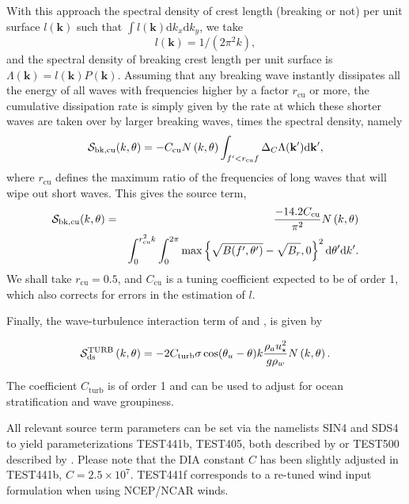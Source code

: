 With this approach the spectral density of crest length (breaking or not) per
unit surface $l(\mathbf{k})$ such that $\int l(\mathbf{k}) \mathrm{d}k_x
\mathrm{d}k_y$, we take
\begin{equation}
l(\mathbf{k})= 1/(2\pi^2 k),
\end{equation}
and the spectral density of breaking crest length per unit surface is
$\Lambda(\mathbf{k})=l(\mathbf{k})P(\mathbf{k})$.  Assuming that any breaking
wave instantly dissipates all the energy of all waves with frequencies higher
by a factor $r_{\mathrm{cu}}$ or more, the cumulative dissipation rate is
simply given by the rate at which these shorter waves are taken over by larger
breaking waves, times the spectral density, namely
\begin{equation}
{\cal S}_{\mathrm{bk,cu}}(k,\theta) = -C_{\mathrm{cu}}  N \left(k,\theta\right) \int_{f' < r_{\mathrm{cu}} f } \Delta_C \Lambda(\mathbf{k'}) \mathrm{d\mathbf{k'}},
\label{Sds_cu1}
\end{equation}
where $r_{\mathrm{cu}}$ defines the maximum ratio of the frequencies of long
waves that will wipe out short waves.  This gives the source term,
\begin{eqnarray}
{\cal S}_{\mathrm{bk,cu}}(k,\theta) &=&  \frac{-14.2 C_{\mathrm{cu}}}{\pi^2}  N \left(k,\theta\right)
 \nonumber \\
& &\int_0^{ r^2_{\mathrm{cu}} k }\int_0^{2\pi}
\max \left\{\sqrt{B(f',\theta')}-\sqrt{B_r},0\right\}^2
\mathrm{d}\theta' \mathrm{d}k'.
\label{Sds_sat_isotropic}
\end{eqnarray}
We shall take $r_{\mathrm{cu}}=0.5$, and $C_{\mathrm{cu}}$ is a tuning
coefficient expected to be of order 1, which also corrects for errors in the
estimation of $l$.


Finally, the wave-turbulence interaction term of \cite{art:TB02} and \cite{art:AJ06},
is given by

\begin{equation}
{\cal S}_{\mathrm{ds}}^{\mathrm{TURB}}\left(k,\theta\right) = - 2
C_{\mathrm{turb}} \sigma \cos(\theta_u - \theta) k \frac{\rho_a
u_\star^2}{g \rho_w}  N\left(k,\theta\right) .
\end{equation}

\noindent
The coefficient $C_{\mathrm{turb}}$ is of order 1 and can be used to adjust for
ocean stratification and wave groupiness.

All relevant source term parameters can be set via the namelists SIN4 and SDS4
to yield parameterizations TEST441b, TEST405, both described by
\cite{art:Aea10} or TEST500 described by \cite{art:FA12}. Please note that the
DIA constant $C$ has been slightly adjusted in TEST441b, $C=2.5\times
10^7$. TEST441f corresponds to a re-tuned wind input formulation when using
NCEP/NCAR winds.

